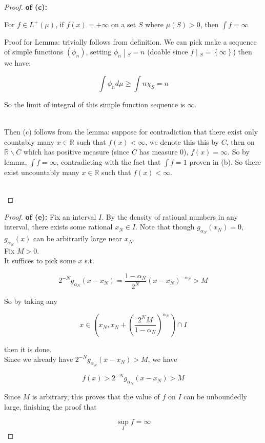 \documentclass{qlnotes-export}
\begin{document}
\begin{proof}

\textbf{of (c):}

\begin{lemma}\label{lem-hw05-on-integration-lemma-001}

For \(f \in L^{+}(\mu)\), if \(f(x) = + \infty\) on a set \(S\) where \(\mu(S) > 0\), then \(\int f = \infty\)

\end{lemma}

Proof for Lemma: trivially follows from definition. We can pick make a sequence of simple functions \((\phi_{n})\), setting \(\left. \phi_{n} \middle| {}_{S} = n \right.\) (doable since \(\left. f \middle| {}_{S} = \left\{ \infty \right\} \right.\)) then we have:

\[\int\phi_{n} d\mu \geq \int n\chi_{S} = n\]

So the limit of integral of this simple function sequence is \(\infty\).\\
\strut \\
Then (c) follows from the lemma: suppose for contradiction that there exist only countably many \(x \in {\mathbb{R}}\) such that \(f(x) < \infty\), we denote this this by \(C\), then on \({\mathbb{R}}\backslash C\) which has positive measure (since \(C\) has measure 0), \(f(x) = \infty\). So by lemma, \(\int f = \infty\), contradicting with the fact that \(\int f = 1\) proven in (b). So there exist uncountably many \(x \in {\mathbb{R}}\) such that \(f(x) < \infty\).\\
\strut \\

\end{proof}

\begin{proof}

\textbf{of (e):} Fix an interval \(I\). By the density of rational numbers in any interval, there exists some rational \(x_{N} \in I\). Note that though \(g_{\alpha_{N}}(x_{N}) = 0\), \(g_{\alpha_{N}}(x)\) can be arbitrarily large near \(x_{N}\).\\
Fix \(M > 0\).\\
It suffices to pick some \(x\) s.t.

\[2^{- N}g_{\alpha_{N}}(x - x_{N}) = \frac{1 - \alpha_{N}}{2^{N}}(x - x_{N})^{- \alpha_{N}} > M\]

So by taking any

\[x \in (x_{N},x_{N} + (\frac{2^{N}M}{1 - \alpha_{N}})^{\alpha_{N}}) \cap I\]

then it is done.\\
Since we already have \(2^{- N}g_{\alpha_{N}}(x - x_{N}) > M\), we have

\[f(x) > 2^{- N}g_{\alpha_{N}}(x - x_{N}) > M\]

Since \(M\) is arbitrary, this proves that the value of \(f\) on \(I\) can be unboundedly large, finishing the proof that

\[\sup\limits_{I}f = \infty\]

\end{proof}
\end{document}
